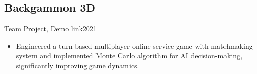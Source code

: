 \subsection{Backgammon 3D}{Team Project, \href{https://youtu.be/54Xh9yhKRNs}{Demo link}}{2021}
\begin{itemize}
    \item Engineered a turn-based multiplayer online service game with matchmaking system and implemented Monte Carlo algorithm for AI decision-making, significantly improving game dynamics.
\end{itemize}
